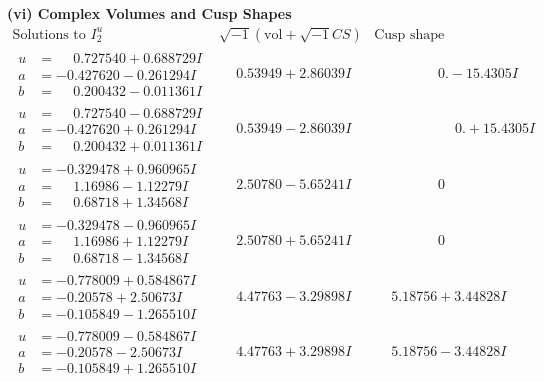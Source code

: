 \documentclass[1p]{elsarticle_modified}
\theoremstyle{definition}
\newcommand{\I}{\sqrt{-1}}
\begin{document}
\newpage\flushleft \textbf{(vi) Complex Volumes and Cusp Shapes}
$$\begin{array}{c|c|c}  
\text{Solutions to }I^u_{2}& \I (\text{vol} + \sqrt{-1}CS) & \text{Cusp shape}\\
 \hline 
\begin{aligned}
u &= \phantom{-}0.727540 + 0.688729 I \\
a &= -0.427620 - 0.261294 I \\
b &= \phantom{-}0.200432 - 0.011361 I\end{aligned}
 & \phantom{-}0.53949 + 2.86039 I & \phantom{-0.000000 } 0. - 15.4305 I \\ \hline\begin{aligned}
u &= \phantom{-}0.727540 - 0.688729 I \\
a &= -0.427620 + 0.261294 I \\
b &= \phantom{-}0.200432 + 0.011361 I\end{aligned}
 & \phantom{-}0.53949 - 2.86039 I & \phantom{-0.000000 -}0. + 15.4305 I \\ \hline\begin{aligned}
u &= -0.329478 + 0.960965 I \\
a &= \phantom{-}1.16986 - 1.12279 I \\
b &= \phantom{-}0.68718 + 1.34568 I\end{aligned}
 & \phantom{-}2.50780 - 5.65241 I & \phantom{-0.000000 } 0 \\ \hline\begin{aligned}
u &= -0.329478 - 0.960965 I \\
a &= \phantom{-}1.16986 + 1.12279 I \\
b &= \phantom{-}0.68718 - 1.34568 I\end{aligned}
 & \phantom{-}2.50780 + 5.65241 I & \phantom{-0.000000 } 0 \\ \hline\begin{aligned}
u &= -0.778009 + 0.584867 I \\
a &= -0.20578 + 2.50673 I \\
b &= -0.105849 - 1.265510 I\end{aligned}
 & \phantom{-}4.47763 - 3.29898 I & \phantom{-}5.18756 + 3.44828 I \\ \hline\begin{aligned}
u &= -0.778009 - 0.584867 I \\
a &= -0.20578 - 2.50673 I \\
b &= -0.105849 + 1.265510 I\end{aligned}
 & \phantom{-}4.47763 + 3.29898 I & \phantom{-}5.18756 - 3.44828 I \\ \hline\begin{aligned}

\end{aligned}
\end{array}$$
\end{document}
